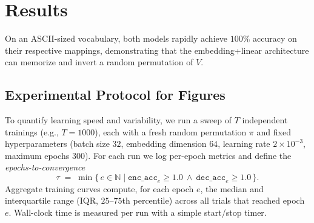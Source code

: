 \documentclass[12pt]{article}
\begin{document}
\section{Results}
On an ASCII-sized vocabulary, both models rapidly achieve $100\%$ accuracy on their respective mappings, demonstrating that the embedding+linear architecture can memorize and invert a random permutation of $V$.

\subsection*{Experimental Protocol for Figures}
To quantify learning speed and variability, we run a sweep of $T$ independent trainings (e.g., $T=1000$), each with a fresh random permutation $\pi$ and fixed hyperparameters (batch size $32$, embedding dimension $64$, learning rate $2\times10^{-3}$, maximum epochs $300$). For each run we log per-epoch metrics and define the \emph{epochs-to-convergence}
\[
\tau \;=\; \min\{\,e\in\mathbb{N} \;|\; \texttt{enc\_acc}_e \ge 1.0 \ \wedge\  \texttt{dec\_acc}_e \ge 1.0 \,\}.
\]
Aggregate training curves compute, for each epoch $e$, the median and interquartile range (IQR, $25$--$75$th percentile) across all trials that reached epoch $e$. Wall-clock time is measured per run with a simple start/stop timer.
\end{document}

